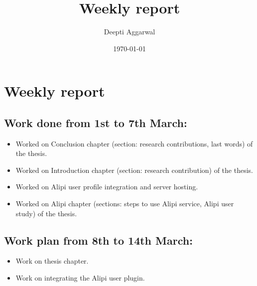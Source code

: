\documentclass[11pt]{article}
\title{Weekly report}
\author{Deepti Aggarwal}
\date{\today}
\begin{document}
\maketitle

\setcounter{tocdepth}{3}
\vspace*{1cm}
\section{Weekly report}
\label{sec-1}

\subsection{Work done from 1st to 7th March:}
\label{sec-1-1}
\begin{itemize}
\item Worked on Conclusion chapter  (section: research contributions, last words) of the thesis. 
\item Worked on Introduction chapter (section: research contribution) of the thesis. 
\item Worked on Alipi user profile integration and server hosting.
\item Worked on Alipi chapter (sections: steps to use Alipi service, Alipi user study) of the thesis.
\end{itemize}

\subsection{Work plan from 8th to 14th March:}
\label{sec-1-1}
\begin{itemize}
\item Work on thesis chapter.
\item Work on integrating the Alipi user plugin.
\end{itemize}
\end{document}
